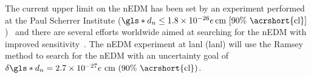 The current upper limit on the nEDM has been set by an experiment performed at the Paul Scherrer Institute ($\gls*{d_n}\leq 1.8\times10^{-26}e\,\text{cm [90\% \acrshort{cl}]}$)~\cite{ABE20} and there are several efforts worldwide aimed at searching for the nEDM with improved sensitivity~\cite{Alarcon2022}. The nEDM experiment at \acrlong*{lanl} (\acrshort*{lanl}) will use the Ramsey method to search for the nEDM with an uncertainty goal of $\delta \gls*{d_n} = 2.7\times10^{-27}e\text{ cm (90\% \acrshort{cl})}$.

